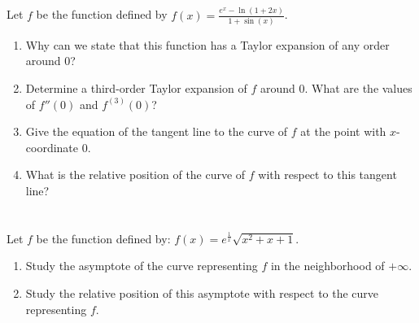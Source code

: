 \documentclass[12pt]{article}
\begin{document}
\newpage

\begin{answerbox}


\end{answerbox}

\newpage

\section{}
Let $f$ be the function defined by $f(x) = \frac{e^x - \ln(1+2x)}{1+\sin(x)}$.
\begin{enumerate}
    \item Why can we state that this function has a Taylor expansion of any order around $0$?
    
    \item Determine a third-order Taylor expansion of $f$ around $0$. What are the values of $f''(0)$ and $f^{(3)}(0)$?
    
    \item Give the equation of the tangent line to the curve of $f$ at the point with $x$-coordinate $0$.
    
    \item What is the relative position of the curve of $f$ with respect to this tangent line?
\end{enumerate}

\newpage

\begin{answerbox}


\end{answerbox}

\newpage

\section{}
Let $f$ be the function defined by: $f(x) = e^{\frac{1}{x}}\sqrt{x^2 + x + 1}$.
\begin{enumerate}
    \item Study the asymptote of the curve representing $f$ in the neighborhood of $+\infty$.
    
    \item Study the relative position of this asymptote with respect to the curve representing $f$.
\end{enumerate}

\newpage

\begin{answerbox}


\end{answerbox}

\end{document}
